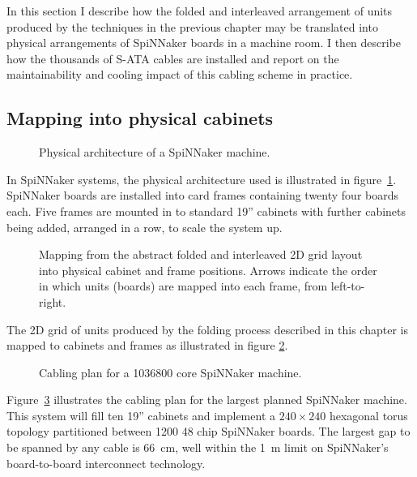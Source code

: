 		In this section I describe how the folded and interleaved arrangement of
		units produced by the techniques in the previous chapter may be translated
		into physical arrangements of SpiNNaker boards in a machine room. I then
		describe how the thousands of S-ATA cables are installed and report on the
		maintainability and cooling impact of this cabling scheme in practice.
		
		\subsection{Mapping into physical cabinets}
			
			\begin{figure}
				\center
				
				\caption{Physical architecture of a SpiNNaker machine.}
				\label{fig:cabinet-units}
			\end{figure}
			
			In SpiNNaker systems, the physical architecture used is illustrated in
			figure~\ref{fig:cabinet-units}. SpiNNaker boards are installed into card
			frames containing twenty four boards each. Five frames are mounted in to
			standard 19'' cabinets with further cabinets being added, arranged in a
			row, to scale the system up.
			
			\begin{figure}
				\center
				
				\caption{Mapping from the abstract folded and interleaved 2D grid
				layout into physical cabinet and frame positions. Arrows indicate the
				order in which units (boards) are mapped into each frame, from
				left-to-right.}
				\label{fig:cabinetisation}
			\end{figure}
			
			The 2D grid of units produced by the folding process described in this
			chapter is mapped to cabinets and frames as illustrated in figure
			\ref{fig:cabinetisation}.
			
			\begin{figure}
				\center
				
				\caption{Cabling plan for a \num{1036800} core SpiNNaker machine.}
				\label{fig:million-core-machine}
			\end{figure}
			
			Figure~\ref{fig:million-core-machine} illustrates the cabling plan for
			the largest planned SpiNNaker machine. This system will fill ten 19''
			cabinets and implement a $240 \times 240$ hexagonal torus topology
			partitioned between \num{1200} 48 chip SpiNNaker boards. The largest gap
			to be spanned by any cable is \SI{66}{\centi\meter}, well within the
			\SI{1}{\meter} limit on SpiNNaker's board-to-board interconnect
			technology.
			
